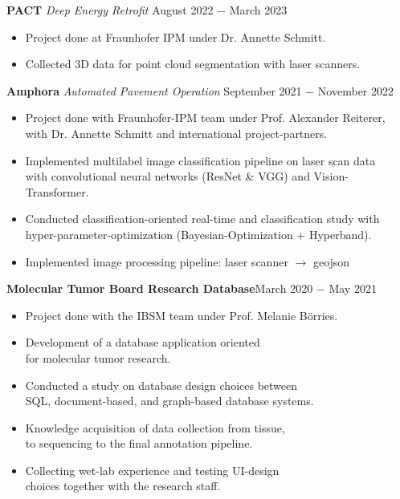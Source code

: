 \documentclass{article}
\begin{document}
\noindent \textbf{PACT} \textit{Deep Energy Retrofit} \hfill August 2022 $-$ March 2023
\begin{itemize}[noitemsep,nolistsep,leftmargin=*]
    \item Project done at Fraunhofer IPM under Dr. Annette Schmitt.
    \item Collected 3D data for point cloud segmentation with laser scanners. \\
\end{itemize}


\noindent \textbf{Amphora} \textit{Automated Pavement Operation} \hfill  September 2021 $-$ November 2022
\begin{itemize}[noitemsep,nolistsep,leftmargin=*]
    \item Project done with Fraunhofer-IPM team under Prof. Alexander Reiterer, \\
     with Dr. Annette Schmitt and international project-partners.
    \item Implemented multilabel image classification pipeline on laser scan data \\
    with convolutional neural networks (ResNet \& VGG) and Vision-Transformer.
    \item Conducted classification-oriented real-time and classification study with \\
    hyper-parameter-optimization (Bayesian-Optimization + Hyperband).
    \item Implemented image processing pipeline: laser scanner $\to$ geojson \\
\end{itemize} 


\noindent \textbf{Molecular Tumor Board Research Database}\hfill  March 2020 $-$ May 2021
\begin{itemize}[noitemsep,nolistsep,leftmargin=*]
    \item Project done with the IBSM team under Prof. Melanie Börries.
    \item Development of a database application oriented \\ 
    for molecular tumor research.
    \item Conducted a study on database design choices between \\
    SQL, document-based, and graph-based database systems.
    \item Knowledge acquisition of data collection from tissue, \\
    to sequencing to the final annotation pipeline. 
    \item Collecting wet-lab experience and testing UI-design\\
    choices together with the research staff.\\
\end{itemize}
\end{document}
